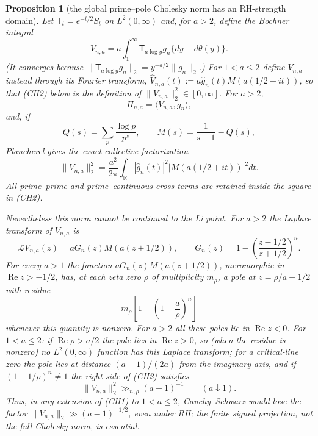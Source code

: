 \documentclass[11pt]{amsart}
\newtheorem{proposition}[theorem]{Proposition}
\theoremstyle{definition}
\theoremstyle{remark}
\theoremstyle{definition}
\renewcommand{\Re}{\operatorname{Re}}
\begin{document}
\begin{proposition}[the global prime--pole Cholesky norm has an RH-strength domain]
\label{prop:a1-prime-cholesky-domain}
Let $\mathsf T_t=e^{-t/2}S_t$ on $L^2(0,\infty)$ and, for $a>2$, define the
Bochner integral
\[
 V_{n,a}=a\int_1^\infty \mathsf T_{a\log y}g_n\{dy-d\theta(y)\}.
\]
(It converges because $\|\mathsf T_{a\log y}g_n\|_2=y^{-a/2}\|g_n\|_2$.)  For
$1<a\le2$ define $V_{n,a}$ instead through its Fourier transform,
$\widehat V_{n,a}(t):=a\widehat g_n(t)M(a(1/2+it))$, so that (CH2) below is
the definition of $\|V_{n,a}\|_2^2\in[0,\infty]$.  For $a>2$,
\[
 \Pi_{n,a}=\langle V_{n,a},g_n\rangle,         \tag{CH1}
\]
and, if
\[
 Q(s)=\sum_p\frac{\log p}{p^s},\qquad M(s)=\frac1{s-1}-Q(s),
\]
Plancherel gives the exact collective factorization
\[
 \|V_{n,a}\|_2^2
 =\frac{a^2}{2\pi}\int_{\mathbb R}|\widehat g_n(t)|^2
       |M(a(1/2+it))|^2dt.                                  \tag{CH2}
\]
All prime--prime and prime--continuous cross terms are retained inside the
square in (CH2).

Nevertheless this norm cannot be continued to the Li point.  For $a>2$ the
Laplace transform of $V_{n,a}$ is
\[
 \mathcal LV_{n,a}(z)=aG_n(z)M(a(z+1/2)),\qquad
 G_n(z)=1-\left(\frac{z-1/2}{z+1/2}\right)^n.                \tag{CH3}
\]
For every $a>1$ the function $aG_n(z)M(a(z+1/2))$, meromorphic in $\Re z>-1/2$, has, at
each zeta zero $\rho$ of multiplicity $m_\rho$, a pole at
$z=\rho/a-1/2$ with residue
\[
 m_\rho\left[1-\left(1-\frac a\rho\right)^n\right]         \tag{CH4}
\]
whenever this quantity is nonzero.  For $a>2$ all these poles lie in
$\Re z<0$.  For $1<a\le2$: if $\Re\rho>a/2$ the pole lies in $\Re z>0$,
so (when the residue is nonzero) no $L^2(0,\infty)$ function has this
Laplace transform; for a critical-line zero the pole lies at distance
$(a-1)/(2a)$ from the imaginary axis, and if $(1-1/\rho)^n\ne1$ the right side of (CH2) satisfies
\[
 \|V_{n,a}\|_2^2\gg_{n,\rho}(a-1)^{-1}\qquad(a\downarrow1). \tag{CH5}
\]
Thus, in any extension of (CH1) to $1<a\le2$, Cauchy--Schwarz would lose the factor
$\|V_{n,a}\|_2\gg(a-1)^{-1/2}$, even under RH;
the finite signed projection, not the full Cholesky norm, is essential.
\end{proposition}
\end{document}
